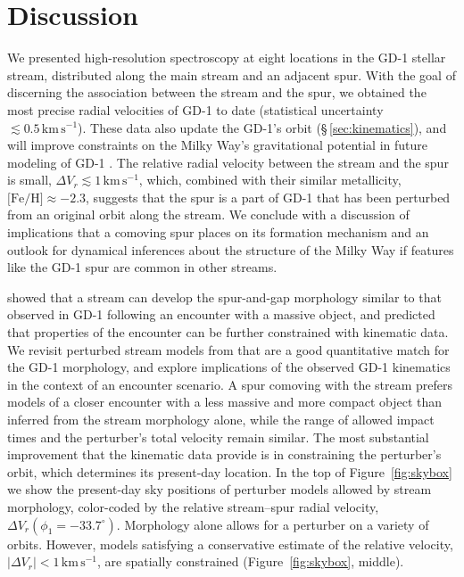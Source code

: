 \documentclass[twocolumn]{aastex63}
\newcommand{\kms}{\ensuremath{\textrm{km}\,\textrm{s}^{-1}}}
\newcommand{\feh}{\ensuremath{\textrm{[Fe/H]}}}
\begin{document}
\section{Discussion}
\label{sec:discussion}

We presented high-resolution spectroscopy at eight locations in the GD-1 stellar stream, distributed along the main stream and an adjacent spur.
With the goal of discerning the association between the stream and the spur, we obtained the most precise radial velocities of GD-1 to date (statistical uncertainty $\lesssim0.5\,\kms$).
These data also update the GD-1's orbit (\S\,\ref{sec:kinematics}), and will improve constraints on the Milky Way's gravitational potential in future modeling of GD-1 \citep[similar to, e.g.,][]{koposov2010, bowden2015, bovy2016}.
The relative radial velocity between the stream and the spur is small, $\Delta V_r\lesssim1\,\kms$, which, combined with their similar metallicity, $\feh\approx-2.3$, suggests that the spur is a part of GD-1 that has been perturbed from an original orbit along the stream.
We conclude with a discussion of implications that a comoving spur places on its formation mechanism and an outlook for dynamical inferences about the structure of the Milky Way if features like the GD-1 spur are common in other streams.

\citet{bonaca2019a} showed that a stream can develop the spur-and-gap morphology similar to that observed in GD-1 following an encounter with a massive object, and predicted that properties of the encounter can be further constrained with kinematic data.
We revisit perturbed stream models from \citet{bonaca2019a} that are a good quantitative match for the GD-1 morphology, and explore implications of the observed GD-1 kinematics in the context of an encounter scenario.
A spur comoving with the stream prefers models of a closer encounter with a less massive and more compact object than inferred from the stream morphology alone, while the range of allowed impact times and the perturber's total velocity remain similar.
The most substantial improvement that the kinematic data provide is in constraining the perturber's orbit, which determines its present-day location.
In the top of Figure~\ref{fig:skybox} we show the present-day sky positions of perturber models allowed by stream morphology, color-coded by the relative stream--spur radial velocity, $\Delta V_r(\phi_1=-33.7^\circ)$.
Morphology alone allows for a perturber on a variety of orbits.
However, models satisfying a conservative estimate of the relative velocity, $|\Delta V_r|<1\,\kms$, are spatially constrained (Figure~\ref{fig:skybox}, middle).
\end{document}
